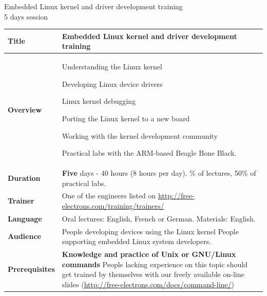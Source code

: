 \documentclass[a4paper,12pt,obeyspaces,spaces,hyphens]{article}
\begin{document}
\thispagestyle{fancy}

\setlength{\arrayrulewidth}{0.8pt}

\begin{center}
\LARGE
Embedded Linux kernel and driver development training\\
\large
5 days session
\end{center}
\vspace{1cm}

\small
{}

 {
  \begin{tabularx}{\textwidth}{|g|h|}
    {\bf Title} & Embedded Linux kernel and driver development
    training \\
    \hline

    {\bf Overview} &
    Understanding the Linux kernel \par
    Developing Linux device drivers \par
    Linux kernel debugging \par
    Porting the Linux kernel to a new board \par
    Working with the kernel development community \par
    Practical labs with the ARM-based Beagle Bone Black.\\
    \hline

    {\bf Duration} & {\bf Five} days - 40 hours (8 hours per day).
    \% of lectures, 50\% of practical labs. \\
    \hline

    {\bf Trainer} & One of the engineers listed on
    \newline \url{http://free-electrons.com/training/trainers/}\\
    \hline

    {\bf Language} & Oral lectures: English, French or German.
    \newline Materials: English.\\
    \hline

    {\bf Audience} & People developing devices using the Linux kernel
    \newline People supporting embedded Linux system developers. \\
    \hline

    {\bf Prerequisites} & {\bf Knowledge and practice of Unix or
      GNU/Linux commands}
    \newline People lacking experience on this topic should get
    trained by themselves with our freely available on-line slides
    (\url{http://free-electrons.com/docs/command-line/})
     \\
    \hline


\end{tabularx}}
\end{document}

